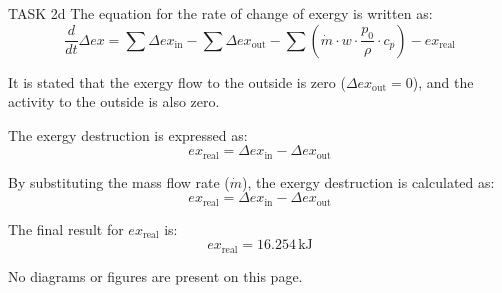 TASK 2d  
The equation for the rate of change of exergy is written as:  
\[
\frac{d}{dt} \Delta ex = \sum \Delta ex_{\text{in}} - \sum \Delta ex_{\text{out}} - \sum \left( \dot{m} \cdot w \cdot \frac{p_0}{\rho} \cdot c_p \right) - ex_{\text{real}}
\]  

It is stated that the exergy flow to the outside is zero (\( \Delta ex_{\text{out}} = 0 \)), and the activity to the outside is also zero.  

The exergy destruction is expressed as:  
\[
ex_{\text{real}} = \Delta ex_{\text{in}} - \Delta ex_{\text{out}}
\]  

By substituting the mass flow rate (\( \dot{m} \)), the exergy destruction is calculated as:  
\[
ex_{\text{real}} = \Delta ex_{\text{in}} - \Delta ex_{\text{out}}
\]  

The final result for \( ex_{\text{real}} \) is:  
\[
ex_{\text{real}} = 16.254 \, \text{kJ}
\]  

No diagrams or figures are present on this page.